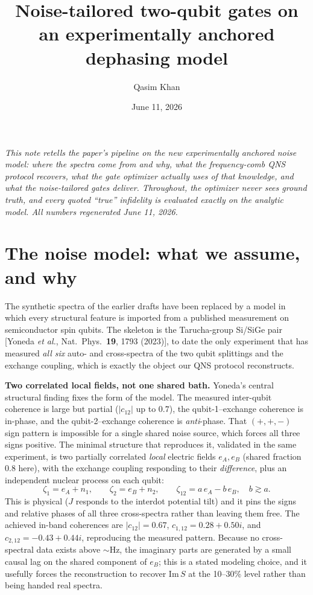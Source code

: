 \documentclass[10pt]{article}
\title{\vspace{-1.5em}Noise-tailored two-qubit gates on an experimentally
anchored dephasing model\vspace{-0.4em}}
\author{Qasim Khan}
\date{June 11, 2026}
\begin{document}
\maketitle
\vspace{-1.8em}

\textit{This note retells the paper's pipeline on the new experimentally
anchored noise model: where the spectra come from and why, what the
frequency-comb QNS protocol recovers, what the gate optimizer actually uses
of that knowledge, and what the noise-tailored gates deliver. Throughout,
the optimizer never sees ground truth, and every quoted ``true'' infidelity
is evaluated exactly on the analytic model. All numbers regenerated June 11,
2026.}

\section{The noise model: what we assume, and why}\label{sec:model}

The synthetic spectra of the earlier drafts have been replaced by a model in
which every structural feature is imported from a published measurement on
semiconductor spin qubits. The skeleton is the Tarucha-group Si/SiGe pair
[Yoneda \emph{et al.}, Nat.\ Phys.\ \textbf{19}, 1793 (2023)], to date the
only experiment that has measured \emph{all six} auto- and cross-spectra of
the two qubit splittings and the exchange coupling, which is exactly the
object our QNS protocol reconstructs.

\textbf{Two correlated local fields, not one shared bath.} Yoneda's central
structural finding fixes the form of the model. The measured inter-qubit
coherence is large but partial ($|c_{12}|$ up to $0.7$), the
qubit-1--exchange coherence is in-phase, and the qubit-2--exchange coherence
is \emph{anti}-phase. That $(+,+,-)$ sign pattern is impossible for a single
shared noise source, which forces all three signs positive. The minimal
structure that reproduces it, validated in the same experiment, is two
partially correlated \emph{local} electric fields $e_A, e_B$ (shared
fraction 0.8 here), with the exchange coupling responding to their
\emph{difference}, plus an independent nuclear process on each qubit:
\begin{equation*}
\zeta_1 = e_A + n_1, \qquad
\zeta_2 = e_B + n_2, \qquad
\zeta_{12} = a\, e_A - b\, e_B, \quad b \gtrsim a .
\end{equation*}
This is physical ($J$ responds to the interdot potential tilt) and it pins
the signs and relative phases of all three cross-spectra rather than leaving
them free. The achieved in-band coherences are $|c_{12}| = 0.67$,
$c_{1,12} = 0.28+0.50i$, and $c_{2,12} = -0.43+0.44i$, reproducing the
measured pattern. Because no cross-spectral data exists above $\sim$Hz, the
imaginary parts are generated by a small causal lag on the shared component
of $e_B$; this is a stated modeling choice, and it usefully forces the
reconstruction to recover $\mathrm{Im}\,S$ at the 10--30\% level rather than
being handed real spectra.
\end{document}
